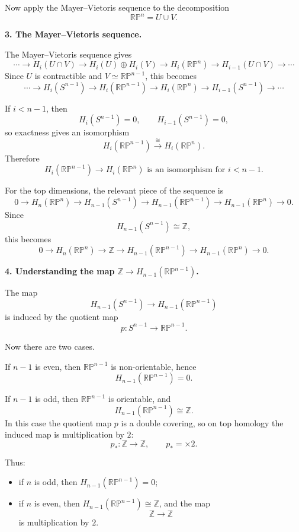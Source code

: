 \documentclass[12pt,a4paper]{article}
\theoremstyle{notespace}
\begin{document}
Now apply the Mayer--Vietoris sequence to the decomposition
\[
\mathbb{RP}^n=U\cup V.
\]

\medskip

\textbf{3. The Mayer--Vietoris sequence.}

The Mayer--Vietoris sequence gives
\[
\cdots \to H_i(U\cap V)\to H_i(U)\oplus H_i(V)\to H_i(\mathbb{RP}^n)\to H_{i-1}(U\cap V)\to \cdots
\]
Since \(U\) is contractible and \(V\simeq \mathbb{RP}^{n-1}\), this becomes
\[
\cdots \to H_i(S^{n-1})\to H_i(\mathbb{RP}^{n-1})\to H_i(\mathbb{RP}^n)\to H_{i-1}(S^{n-1})\to \cdots
\]

If \(i<n-1\), then
\[
H_i(S^{n-1})=0,
\qquad
H_{i-1}(S^{n-1})=0,
\]
so exactness gives an isomorphism
\[
H_i(\mathbb{RP}^{n-1})\xrightarrow{\cong} H_i(\mathbb{RP}^n).
\]
Therefore
\[
\boxed{H_i(\mathbb{RP}^{n-1})\to H_i(\mathbb{RP}^n)\text{ is an isomorphism for }i<n-1.}
\]

For the top dimensions, the relevant piece of the sequence is
\[
0\to H_n(\mathbb{RP}^n)\to H_{n-1}(S^{n-1})\to H_{n-1}(\mathbb{RP}^{n-1})\to H_{n-1}(\mathbb{RP}^n)\to 0.
\]
Since
\[
H_{n-1}(S^{n-1})\cong \mathbb Z,
\]
this becomes
\[
\boxed{
	0 \longrightarrow H_n(\mathbb{RP}^n) \longrightarrow \mathbb Z \longrightarrow H_{n-1}(\mathbb{RP}^{n-1}) \longrightarrow H_{n-1}(\mathbb{RP}^n) \longrightarrow 0.
}
\]

\medskip

\textbf{4. Understanding the map \(\mathbb Z\to H_{n-1}(\mathbb{RP}^{n-1})\).}

The map
\[
H_{n-1}(S^{n-1})\to H_{n-1}(\mathbb{RP}^{n-1})
\]
is induced by the quotient map
\[
p:S^{n-1}\to \mathbb{RP}^{n-1}.
\]

Now there are two cases.

If \(n-1\) is even, then \(\mathbb{RP}^{n-1}\) is non-orientable, hence
\[
H_{n-1}(\mathbb{RP}^{n-1})=0.
\]

If \(n-1\) is odd, then \(\mathbb{RP}^{n-1}\) is orientable, and
\[
H_{n-1}(\mathbb{RP}^{n-1})\cong \mathbb Z.
\]
In this case the quotient map \(p\) is a double covering, so on top homology the induced map is multiplication by \(2\):
\[
p_*:\mathbb Z\to \mathbb Z,\qquad p_*=\times 2.
\]

Thus:

\begin{itemize}
	\item if \(n\) is odd, then \(H_{n-1}(\mathbb{RP}^{n-1})=0\);
	\item if \(n\) is even, then \(H_{n-1}(\mathbb{RP}^{n-1})\cong \mathbb Z\), and the map
	\[
	\mathbb Z\to \mathbb Z
	\]
	is multiplication by \(2\).
\end{itemize}
\end{document}
